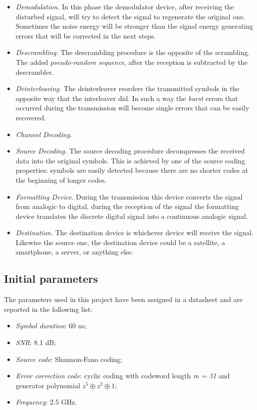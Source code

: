 \begin{itemize}
    \item \textsl{Demodulation.} In this phase the demodulator device, after receiving the disturbed signal, will try to detect the signal to regenerate the original one. Sometimes the noise energy will be stronger than the signal energy generating errors that will be corrected in the next steps.
    \item \textsl{Descrambling.} The descrambling procedure is the opposite of the scrambling. The added \textit{pseudo-random sequence}, after the reception is subtracted by the descrambler.
    \item \textsl{Deinterleaving.} The deinterleaver reorders the transmitted symbols in the opposite way that the interleaver did. In such a way the \textit{burst} errors that occurred during the transmission will become single errors that can be easily recovered.
    \item \textsl{Channel Decoding.} 
    \item \textsl{Source Decoding.} The source decoding procedure decompresses the received data into the original symbols. This is achieved by one of the source coding properties: symbols are easily detected because there are no shorter codes at the beginning of longer codes.
    \item \textsl{Formatting Device.} During the transmission this device converts the signal from analogic to digital, during the reception of the signal the formatting device translates the discrete digital signal into a continuous analogic signal. 
    \item \textsl{Destination.} The destination device is whichever device will receive the signal. Likewise the source one, the destination device could be a satellite, a smartphone, a server, or anything else.
\end{itemize}

\subsection{Initial parameters}
The parameters used in this project have been assigned in a datasheet and are reported in the following list:
\vspace{-5px}
\begin{itemize}
    \renewcommand{\labelitemi}{$\cdot$}
    \setlength{\itemsep}{-2px}
    \item \textsl{Symbol duration}: 60 ns;
    \item \textsl{SNR}: 8.1 dB;
    \item \textsl{Source code}: Shannon-Fano coding;
    \item \textsl{Error correction code}: cyclic coding with codeword length \textit{m = 31} and generator polynomial $ z^5 \oplus z^2 \oplus 1$;
    \item \textsl{Frequency}: 2.5 GHz.
\end{itemize}

